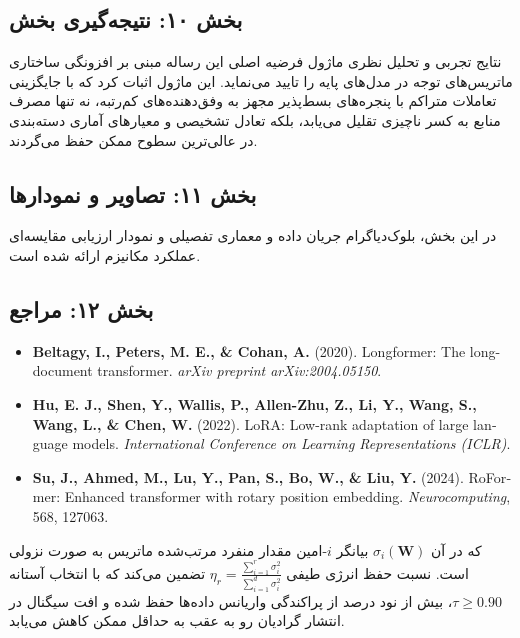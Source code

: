 \subsection*{بخش ۱۰: نتیجه‌گیری بخش }
نتایج تجربی و تحلیل نظری ماژول  فرضیه اصلی این رساله مبنی بر افزونگی ساختاری ماتریس‌های توجه در مدل‌های پایه را تایید می‌نماید. این ماژول اثبات کرد که با جایگزینی تعاملات متراکم با پنجره‌های بسط‌پذیر مجهز به وفق‌دهنده‌های کم‌رتبه، نه تنها مصرف منابع به کسر ناچیزی تقلیل می‌یابد، بلکه تعادل تشخیصی و معیارهای آماری دسته‌بندی در عالی‌ترین سطوح ممکن حفظ می‌گردند.

\subsection*{بخش ۱۱: تصاویر و نمودارها }
در این بخش، بلوک‌دیاگرام جریان داده و معماری تفصیلی و نمودار ارزیابی مقایسه‌ای عملکرد مکانیزم  ارائه شده است.



\subsection*{بخش ۱۲: مراجع }
\begin{latin}
\begin{itemize}
    \item \textbf{Beltagy, I., Peters, M. E., \& Cohan, A.} (2020). Longformer: The long-document transformer. \textit{arXiv preprint arXiv:2004.05150}.
    \item \textbf{Hu, E. J., Shen, Y., Wallis, P., Allen-Zhu, Z., Li, Y., Wang, S., Wang, L., \& Chen, W.} (2022). LoRA: Low-rank adaptation of large language models. \textit{International Conference on Learning Representations (ICLR)}.
    \item \textbf{Su, J., Ahmed, M., Lu, Y., Pan, S., Bo, W., \& Liu, Y.} (2024). RoFormer: Enhanced transformer with rotary position embedding. \textit{Neurocomputing}, 568, 127063.
\end{itemize}
\end{latin}

که در آن $\sigma_i(\mathbf{W})$ بیانگر $i$-امین مقدار منفرد مرتب‌شده ماتریس به صورت نزولی است. نسبت حفظ انرژی طیفی $\eta_r = \frac{\sum_{i=1}^r \sigma_i^2}{\sum_{i=1}^{d} \sigma_i^2}$ تضمین می‌کند که با انتخاب آستانه $\tau \ge 0.90$، بیش از نود درصد از پراکندگی واریانس داده‌ها حفظ شده و افت سیگنال در انتشار گرادیان رو به عقب به حداقل ممکن کاهش می‌یابد.

